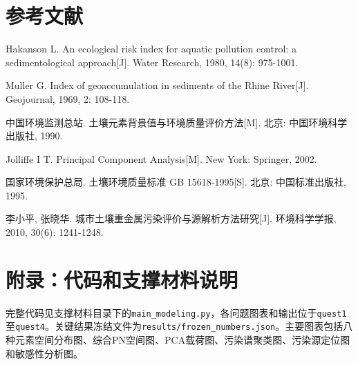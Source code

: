 \documentclass[UTF8,a4paper,12pt]{ctexart}
\begin{document}
\section*{参考文献}
\begin{enumerate}[label={[\arabic*]}]
\item Hakanson L. An ecological risk index for aquatic pollution control: a sedimentological approach[J]. Water Research, 1980, 14(8): 975-1001.
\item Muller G. Index of geoaccumulation in sediments of the Rhine River[J]. Geojournal, 1969, 2: 108-118.
\item 中国环境监测总站. 土壤元素背景值与环境质量评价方法[M]. 北京: 中国环境科学出版社, 1990.
\item Jolliffe I T. Principal Component Analysis[M]. New York: Springer, 2002.
\item 国家环境保护总局. 土壤环境质量标准 GB 15618-1995[S]. 北京: 中国标准出版社, 1995.
\item 李小平, 张晓华. 城市土壤重金属污染评价与源解析方法研究[J]. 环境科学学报, 2010, 30(6): 1241-1248.
\end{enumerate}

\appendix
\section{附录：代码和支撑材料说明}
完整代码见支撑材料目录下的\texttt{main\_modeling.py}，各问题图表和输出位于\texttt{quest1}至\texttt{quest4}。关键结果冻结文件为\texttt{results/frozen\_numbers.json}。主要图表包括八种元素空间分布图、综合PN空间图、PCA载荷图、污染谱聚类图、污染源定位图和敏感性分析图。
\end{document}
